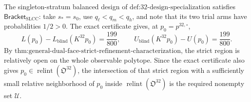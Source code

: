 The singleton-stratum balanced design of \(\text{def:32-design-specialization}\) satisfies \(\mathsf{Bracket}_{\mathrm{SLCC}}\): take \(s_*=s_0\), use \(q_\ell<q_m<q_h\), and note that its two trial arms have probabilities \(1/2>0\).  The exact certificate gives, at \(p_0=p^{32,\circ}\),
\[
L(p_0)-L_{\mathrm{blind}}(K^{32}p_0)=\frac{199}{800},
\qquad
U_{\mathrm{blind}}(K^{32}p_0)-U(p_0)=\frac{199}{800}.
\]
By \(\text{thm:general-dual-face-strict-refinement-characterization}\), the strict region is relatively open on the whole observable polytope.  Since the exact certificate also gives \(p_0\in\operatorname{relint}(\mathfrak O^{32})\), the intersection of that strict region with a sufficiently small relative neighborhood of \(p_0\) inside \(\operatorname{relint}(\mathfrak O^{32})\) is the required nonempty set \(\mathcal U\).